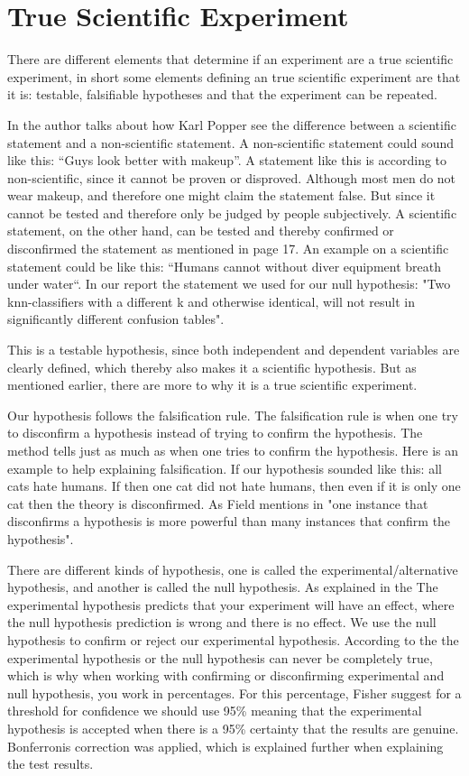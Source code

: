 \section{True Scientific Experiment}
There are different elements that determine if an experiment are a true scientific experiment, in short some elements defining an true scientific experiment are that it is: testable, falsifiable hypotheses and that the experiment can be repeated.

In \citep{Design} the author talks about how Karl Popper see the difference between a scientific statement and a non-scientific statement. A non-scientific statement could sound like this: “Guys look better with makeup”. A statement like this is according to \citep{Design} non-scientific, since it cannot be proven or disproved. Although most men do not wear makeup, and therefore one might claim the statement false. But since it cannot be tested and therefore only be judged by people subjectively. 
A scientific statement, on the other hand, can be tested and thereby confirmed or disconfirmed the statement as mentioned in \citep{Design} page 17. An example on a scientific statement could be like this: “Humans cannot without diver equipment breath under water“.
In our report the statement we used for our null hypothesis: "Two knn-classifiers with a different k and otherwise identical, will not result in significantly different confusion tables". 

This is a testable hypothesis, since both independent and dependent variables are clearly defined, which thereby also makes it a scientific hypothesis. But as mentioned earlier, there are more to why it is a true scientific experiment. 

Our hypothesis follows the falsification rule.
The falsification rule is when one try to disconfirm a hypothesis instead of trying to confirm the hypothesis. The method tells just as much as when one tries to confirm the hypothesis. Here is an example to help explaining  falsification. If our hypothesis sounded like this: all cats hate humans. If then one cat did not hate humans, then even if it is only one cat then the theory is disconfirmed. As Field mentions in \citep[page 17]{Design} "one instance that disconfirms a hypothesis is more powerful than many instances that confirm the hypothesis".

There are different kinds of hypothesis, one is called the experimental/alternative hypothesis, and another is called the null hypothesis. As explained in the \citep[page 141]{Design} The experimental hypothesis predicts that your experiment will have an effect, where the null hypothesis prediction is wrong and there is no effect.
We use the null hypothesis to confirm or reject our experimental hypothesis. According to the \citep{Design} the experimental hypothesis or the null hypothesis can never be completely true, which is why when working with confirming or disconfirming experimental and null hypothesis, you work in percentages. For this percentage, Fisher suggest for a threshold for confidence we should use 95\% meaning that the experimental hypothesis is accepted when there is a 95\% certainty that the results are genuine. Bonferronis correction was applied, which is explained further when explaining the test results. 

